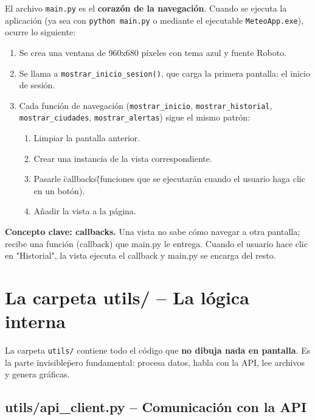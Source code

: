 \documentclass[12pt,a4paper]{article}
\begin{document}
El archivo \texttt{main.py} es el \textbf{corazón de la navegación}. Cuando se ejecuta la aplicación (ya sea con \texttt{python main.py} o mediante el ejecutable \texttt{MeteoApp.exe}), ocurre lo siguiente:

\begin{enumerate}[itemsep=4pt]
    \item Se crea una ventana de 960x680 píxeles con tema azul y fuente Roboto.
    \item Se llama a \texttt{mostrar\_inicio\_sesion()}, que carga la primera pantalla: el inicio de sesión.
    \item Cada función de navegación (\texttt{mostrar\_inicio}, \texttt{mostrar\_historial}, \texttt{mostrar\_ciudades}, \texttt{mostrar\_alertas}) sigue el mismo patrón:
    \begin{enumerate}
        \item Limpiar la pantalla anterior.
        \item Crear una instancia de la vista correspondiente.
        \item Pasarle \"callbacks\" (funciones que se ejecutarán cuando el usuario haga clic en un botón).
        \item Añadir la vista a la página.
    \end{enumerate}
\end{enumerate}

\textbf{Concepto clave: callbacks.} Una vista no sabe cómo navegar a otra pantalla; recibe una función (callback) que main.py le entrega. Cuando el usuario hace clic en "Historial", la vista ejecuta el callback y main.py se encarga del resto.

\section{La carpeta utils/ -- La lógica interna}

La carpeta \texttt{utils/} contiene todo el código que \textbf{no dibuja nada en pantalla}. Es la parte \"invisible\" pero fundamental: procesa datos, habla con la API, lee archivos y genera gráficas.

\subsection{utils/api\_client.py -- Comunicación con la API}
\end{document}
